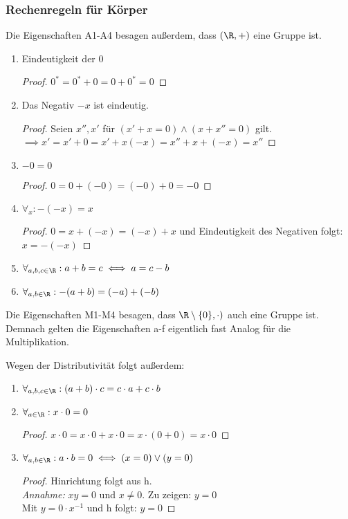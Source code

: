 \subsubsection*{Rechenregeln für Körper}
\begin{remark}
Die Eigenschaften A1-A4 besagen außerdem, dass $(\R,+)$ eine Gruppe ist.
\end{remark}
\begin{enumerate}
	\item Eindeutigkeit der $0$
		\begin{proof}
		$0^{*}= 0^{*}+0 = 0+0^{*}=0$ 
		\end{proof}
	\item Das Negativ $-x$ ist eindeutig.
		\begin{proof}
		Seien $x'', x'$ für $(x'+x=0) \wedge (x+x'' =0) $ gilt. \\
		$\implies x'=x'+0 = x'+x(-x) = x'' +x+(-x) = x''$ 
		\end{proof}
	\item $-0 = 0$
		\begin{proof}
		$0= 0+(-0) = (-0)+0= -0$
		\end{proof}
	\item $\forall_{x}: -(-x) = x $
		\begin{proof}
		$0=x+(-x)= (-x)+x$ und Eindeutigkeit des Negativen folgt: $x=-(-x)$   
		\end{proof}
	\item $\forall_{a,b,c \in \R}: a+b= c \iff a = c-b$
	\item $\forall_{a,b \in \R}: -(a+b) = (-a) + (-b) $ 
\end{enumerate}
\begin{remark}
Die Eigenschaften M1-M4 besagen, dass $\R \setminus \{0\}, \cdot )$ auch eine Gruppe ist. Demnach gelten die Eigenschaften a-f eigentlich fast Analog für die Multiplikation.
\end{remark}
Wegen der Distributivität folgt außerdem:
\begin{enumerate}[resume]
	\item $\forall_{a,b,c \in \R}: (a+b) \cdot c = c\cdot a + c\cdot b $ 
	\item $\forall_{a \in \R}: x\cdot 0=0 $
		\begin{proof}
		$x\cdot 0=x\cdot 0+x\cdot 0 = x \cdot (0+0) = x\cdot 0$ 
		\end{proof}
	\item $\forall_{a,b \in \R}: a \cdot b = 0 \iff (x=0) \vee (y=0)$
		\begin{proof}
		Hinrichtung folgt aus h. \\
		\emph{Annahme:} $xy=0$ und $x\neq 0$. Zu zeigen: $y=0$\\
		Mit $y=0\cdot x^{-1}$ und h folgt: $y=0$ 
		\end{proof}
\end{enumerate}

